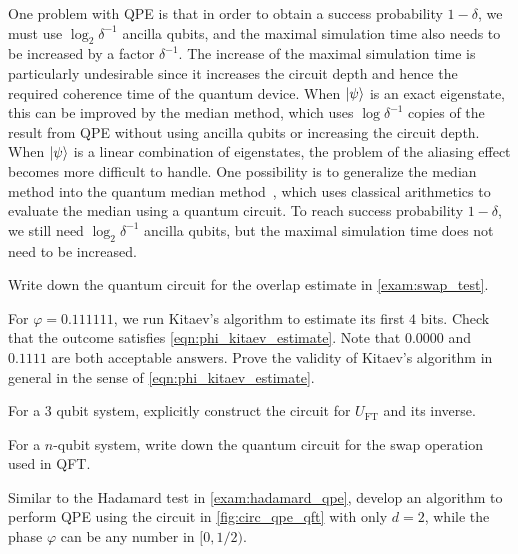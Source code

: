 \begin{rem}
One problem with QPE is that in order to obtain a success probability $1-\delta$, we must use $\log_2 \delta^{-1}$ ancilla qubits, and the maximal simulation time also needs to be increased by a factor $\delta^{-1}$. 
The increase of the maximal simulation time is particularly undesirable since it increases the circuit depth and hence the required coherence time of the quantum device.
When $\ket{\psi}$ is an exact eigenstate, this can be improved by the median method, which uses $\log \delta^{-1}$ copies of the result from QPE without using ancilla qubits or increasing the circuit depth.
When $\ket{\psi}$ is a linear combination of eigenstates, the problem of the aliasing effect becomes more difficult to handle.
One possibility is to generalize the median method into the quantum median method~\cite{NagajWocjanZhang2009}, which uses classical arithmetics to evaluate the median using a quantum circuit.
To reach success probability $1-\delta$, we still need $\log_2 \delta^{-1}$ ancilla qubits, but the maximal simulation time does not need to be increased.
\end{rem}

\vspace{2em}

\begin{exer}
Write down the quantum circuit for the overlap estimate in \cref{exam:swap_test}.
\end{exer}

\begin{exer}
For $\varphi=0.111111$, we run Kitaev's algorithm to estimate its first $4$ bits. Check that the outcome satisfies \cref{eqn:phi_kitaev_estimate}. Note that $0.0000$ and $0.1111$ are both acceptable answers.
Prove the validity of Kitaev's algorithm in general in the sense of \cref{eqn:phi_kitaev_estimate}.
\end{exer}

\begin{exer}
For a $3$ qubit system, explicitly construct the circuit for $U_{\mathrm{FT}}$ and its inverse. 
\end{exer}

\begin{exer}
For a $n$-qubit system, write down the quantum circuit for the swap operation used in QFT.
\end{exer}

\begin{exer}
Similar to the Hadamard test in \cref{exam:hadamard_qpe}, develop an algorithm to perform QPE using the circuit in \cref{fig:circ_qpe_qft} with only $d=2$, while the phase $\varphi$ can be any number in $[0,1/2)$. 
\end{exer}

